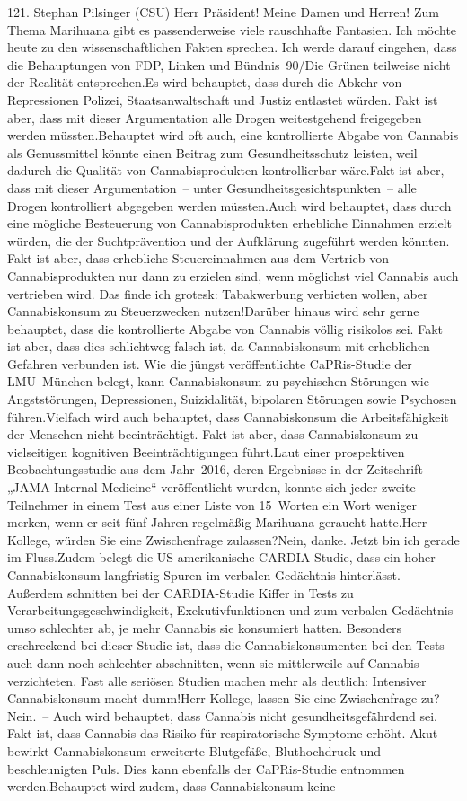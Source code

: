 \documentclass{article}
\begin{document}
	121. Stephan Pilsinger (CSU) Herr Präsident! Meine Damen und Herren! Zum Thema Marihuana gibt es passenderweise viele rauschhafte Fantasien. Ich möchte heute zu den wissenschaftlichen Fakten sprechen. Ich werde darauf eingehen, dass die Behauptungen von FDP, Linken und Bündnis 90/Die Grünen teilweise nicht der Realität entsprechen.Es wird behauptet, dass durch die Abkehr von Repressionen Polizei, Staatsanwaltschaft und Justiz entlastet würden. Fakt ist aber, dass mit dieser Argumentation alle Drogen weitestgehend freigegeben werden müssten.Behauptet wird oft auch, eine kontrollierte Abgabe von Cannabis als Genussmittel könnte einen Beitrag zum Gesundheitsschutz leisten, weil dadurch die Qualität von Cannabisprodukten kontrollierbar wäre.Fakt ist aber, dass mit dieser Argumentation – unter Gesundheitsgesichtspunkten – alle Drogen kontrolliert abgegeben werden müssten.Auch wird behauptet, dass durch eine mögliche Besteuerung von Cannabisprodukten erhebliche Einnahmen erzielt würden, die der Suchtprävention und der Aufklärung zugeführt werden könnten. Fakt ist aber, dass erhebliche Steuereinnahmen aus dem Vertrieb von ­Cannabisprodukten nur dann zu erzielen sind, wenn möglichst viel Cannabis auch vertrieben wird. Das finde ich grotesk: Tabakwerbung verbieten wollen, aber Cannabiskonsum zu Steuerzwecken nutzen!Darüber hinaus wird sehr gerne behauptet, dass die kontrollierte Abgabe von Cannabis völlig risikolos sei. Fakt ist aber, dass dies schlichtweg falsch ist, da Cannabiskonsum mit erheblichen Gefahren verbunden ist. Wie die jüngst veröffentlichte CaPRis-Studie der LMU München belegt, kann Cannabiskonsum zu psychischen Störungen wie Angststörungen, Depressionen, Suizidalität, bipolaren Störungen sowie Psychosen führen.Vielfach wird auch behauptet, dass Cannabiskonsum die Arbeitsfähigkeit der Menschen nicht beeinträchtigt. Fakt ist aber, dass Cannabiskonsum zu vielseitigen kognitiven Beeinträchtigungen führt.Laut einer prospektiven Beobachtungsstudie aus dem Jahr 2016, deren Ergebnisse in der Zeitschrift „JAMA Internal Medicine“ veröffentlicht wurden, konnte sich jeder zweite Teilnehmer in einem Test aus einer Liste von 15 Worten ein Wort weniger merken, wenn er seit fünf Jahren regelmäßig Marihuana geraucht hatte.Herr Kollege, würden Sie eine Zwischenfrage zulassen?Nein, danke. Jetzt bin ich gerade im Fluss.Zudem belegt die US-amerikanische CARDIA-Studie, dass ein hoher Cannabiskonsum langfristig Spuren im verbalen Gedächtnis hinterlässt. Außerdem schnitten bei der CARDIA-Studie Kiffer in Tests zu Verarbeitungsgeschwindigkeit, Exekutivfunktionen und zum verbalen Gedächtnis umso schlechter ab, je mehr Cannabis sie konsumiert hatten. Besonders erschreckend bei dieser Studie ist, dass die Cannabiskonsumenten bei den Tests auch dann noch schlechter abschnitten, wenn sie mittlerweile auf Cannabis verzichteten. Fast alle seriösen Studien machen mehr als deutlich: Intensiver Cannabiskonsum macht dumm!Herr Kollege, lassen Sie eine Zwischenfrage zu?Nein. – Auch wird behauptet, dass Cannabis nicht gesundheitsgefährdend sei. Fakt ist, dass Cannabis das Risiko für respiratorische Symptome erhöht. Akut bewirkt Cannabiskonsum erweiterte Blutgefäße, Bluthochdruck und beschleunigten Puls. Dies kann ebenfalls der CaPRis-Studie entnommen werden.Behauptet wird zudem, dass Cannabiskonsum keine 
\end{document}
